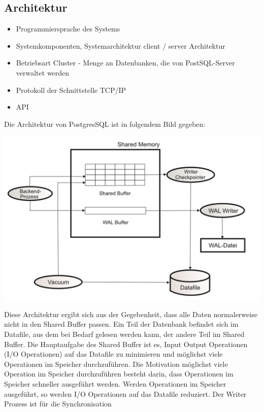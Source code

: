 \subsection{Architektur}
    \begin{itemize}
        \item Programmiersprache des Systems
        \item Systemkomponenten, Systemarchitektur
        \subitem client / server Architektur \cite{postgresqldoc}
        \item Betriebsart
            \subitem Cluster - Menge an Datenbanken, die von PostSQL-Server verwaltet werden \cite{froehlich01}
        \item Protokoll der Schnittstelle
        \subitem TCP/IP
        \item API
    \end{itemize}
    Die Architektur von PostgresSQL ist in folgendem Bild gegeben:
    \begin{center}
        \includegraphics[width = \linewidth]{./images/PostgresSQLArchitektur.jpg}
    \end{center}
    Diese Architektur ergibt sich aus der Gegebenheit, dass alle Daten normalerweise nicht in den Shared Buffer passen. Ein Teil der Datenbank befindet sich im Datafile, aus dem bei Bedarf gelesen werden kann, der andere Teil im Shared Buffer.
    Die Hauptaufgabe des Shared Buffer ist es, Input Output Operationen (I/O Operationen) auf das Datafile zu minimieren und möglichst viele Operationen im Speicher durchzuführen. Die Motivation möglichst viele Operation im Speicher durchzuführen
    besteht darin, dass Operationen im Speicher schneller ausgeführt werden. Werden Operationen im Speicher ausgeführt, so werden I/O Operationen auf das Datafile reduziert. Der Writer Prozess ist für die Synchronisation

